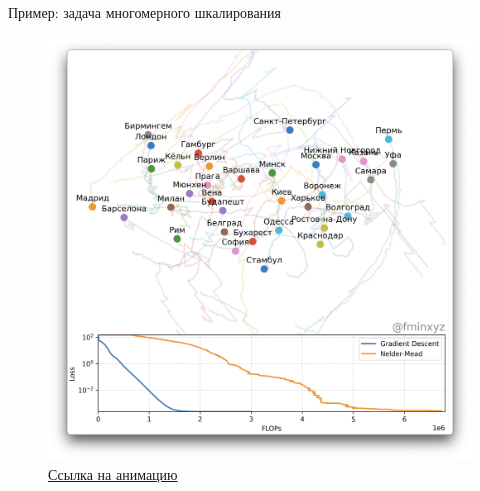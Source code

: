 \documentclass[
  9pt,
  ignorenonframetext,
  aspectratio=169,
]{beamer}
\begin{document}
\begin{frame}{Пример: задача многомерного шкалирования}
\label{ux43fux440ux438ux43cux435ux440-ux437ux430ux434ux430ux447ux430-ux43cux43dux43eux433ux43eux43cux435ux440ux43dux43eux433ux43e-ux448ux43aux430ux43bux438ux440ux43eux432ux430ux43dux438ux44f-1}
\begin{figure}[H]

{\centering \includegraphics[width=0.4\linewidth,height=\textheight,keepaspectratio]{mds.png}

}

\caption{\href{https://getfile.dokpub.com/yandex/get/https://disk.yandex.ru/i/B5uvsro-y6UCkw}{Ссылка
на анимацию}}

\end{figure}%
\end{frame}
\end{document}
